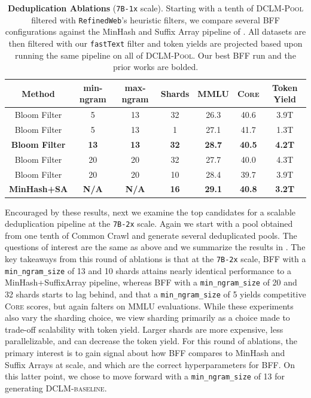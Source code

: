 \documentclass{article}
\newcommand{\rawpool}{\textsc{DCLM-Pool}\xspace}
\newcommand{\hqpool}{\textsc{DCLM-baseline}\xspace}
\newcommand{\ltrack}{\texttt{7B-1x}\xspace}
\newcommand{\xltrack}{\texttt{7B-2x}\xspace}
\newcommand{\rw}{\texttt{RefinedWeb}\xspace}
\newcommand{\fasttext}{\texttt{fastText}\xspace}
\newcommand{\lowvar}{\textsc{Core}\xspace}
\newcommand{\commoncrawl}{Common Crawl\xspace}
\begin{document}
\begin{table}[h]
\centering
\caption{\textbf{Deduplication Ablations} (\ltrack scale). Starting with a tenth of \rawpool filtered with \rw's heuristic filters, we compare several BFF configurations against the MinHash and Suffix Array pipeline of \citep{Lee2021DeduplicatingTD, refinedweb}. All datasets are then filtered with our \fasttext filter and token yields are projected based upon running the same pipeline on all of \rawpool. Our best BFF run and the prior works are bolded. }
\label{table:dedup-ablations-cx1}
\begin{tabular}{cccc|ccc}
\toprule
Method & min-ngram & max-ngram & Shards & MMLU & \lowvar & Token Yield \\
\midrule
Bloom Filter & 5 & 13 & 32 & 26.3 & 40.6 & 3.9T \\
Bloom Filter & 5 & 13 & 1 & 27.1 & 41.7 & 1.3T \\
\textbf{Bloom Filter} & \textbf{13} & \textbf{13} & \textbf{32} & \textbf{28.7} & \textbf{40.5} & \textbf{4.2T} \\
Bloom Filter & 20 & 20 & 32 & 27.7 & 40.0 & 4.3T \\
Bloom Filter & 20 & 20 & 10 & 28.4 & 39.7 & 3.9T \\
\textbf{MinHash+SA} & \textbf{N/A} & \textbf{N/A} & \textbf{16} & \textbf{29.1} & \textbf{40.8} & \textbf{3.2T}\\\bottomrule
\end{tabular}
\end{table}

Encouraged by these results, next we examine the top candidates for a scalable deduplication pipeline at the \xltrack scale. Again we start with a pool obtained from one tenth of \commoncrawl and generate several deduplicated pools. The questions of interest are the same as above and we summarize the results in .
The key takeaways from this round of ablations is that at the \xltrack scale, BFF with a \texttt{min\_ngram\_size} of 13 and 10 shards attains nearly identical performance to a MinHash+SuffixArray pipeline, whereas BFF with a \texttt{min\_ngram\_size} of 20 and 32 shards starts to lag behind, and that a \texttt{min\_ngram\_size} of 5 yields competitive \lowvar scores, but again falters on MMLU evaluations. While these experiments also vary the sharding choice, we view sharding primarily as a choice made to trade-off scalability with token yield. Larger shards are more expensive, less parallelizable, and can decrease the token yield. For this round of ablations, the primary interest is to gain signal about how BFF compares to MinHash and Suffix Arrays at scale, and which are the correct hyperparameters for BFF. On this latter point, we chose to move forward with a \texttt{min\_ngram\_size} of 13 for generating \hqpool.
\end{document}
